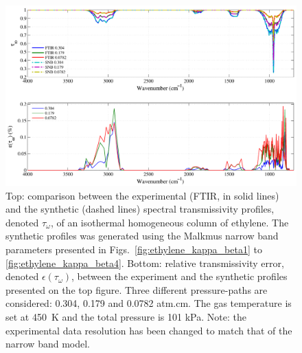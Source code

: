 \begin{figure}[p]
\includegraphics[width=\textwidth]{Figures/Comparison_Fit_Ethylene_MALKMUS_Temp450K.pdf}
\caption{Top: comparison between the experimental (FTIR, in solid lines) and the synthetic (dashed lines) spectral transmissivity profiles, denoted $\tau_{\omega}$, of an isothermal homogeneous column of ethylene. The synthetic profiles was generated using the Malkmus narrow band parameters presented in Figs.~\ref{fig:ethylene_kappa_beta1} to \ref{fig:ethylene_kappa_beta4}. Bottom: relative transmissivity error, denoted $\epsilon{(\tau_{\omega})}$, between the experiment and the synthetic profiles presented on the top figure. Three different pressure-paths are considered: 0.304, 0.179 and 0.0782 atm.cm. The gas temperature is set at 450~K and the total pressure is 101 kPa. Note: the experimental data resolution has been changed to match that of the narrow band model. \label{fig:ethylene_SNBVerify_450K}}
\end{figure}

